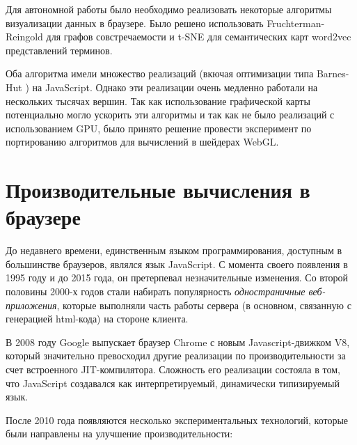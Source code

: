 Для автономной работы было необходимо реализовать некоторые алгоритмы визуализации данных в браузере. Было решено использовать Fruchterman-Reingold для графов совстречаемости и t-SNE для семантических карт word2vec представлений терминов.

Оба алгоритма имели множество реализаций (вкючая оптимизации типа Barnes-Hut \cite{barnes_hut}) на JavaScript. Однако эти реализации очень медленно работали на нескольких тысячах вершин. Так как использование графической карты потенциально могло ускорить эти алгоритмы и так как не было реализаций с использованием GPU, было принято решение провести эксперимент по портированию алгоритмов для вычислений в шейдерах WebGL.

\section{Производительные вычисления в браузере}

До недавнего времени, единственным языком программирования, доступным в большинстве браузеров, являлся язык JavaScript. С момента своего появления в 1995 году и до 2015 года, он претерпевал незначительные изменения. Со второй половины 2000-х годов стали набирать популярность {\itshape одностраничные веб-приложения}, которые выполняли часть работы сервера (в основном, связанную с генерацией html-кода) на стороне клиента.

В 2008 году Google выпускает браузер Chrome с новым Javascript-движком V8, который значительно превосходил другие реализации по производительности за счет встроенного JIT-компилятора. Сложность его реализации состояла в том, что JavaScript создавался как интерпретируемый, динамически типизируемый язык.

После 2010 года появляются несколько экспериментальных технологий, которые были направлены на улучшение производительности:


